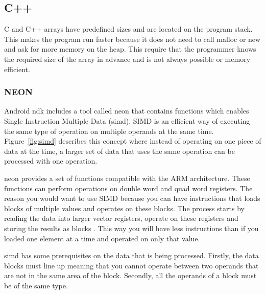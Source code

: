 \subsection{C++}
C and C++ arrays have predefined sizes and are located on the program stack. This makes the program run faster because it does not need to call malloc or new and ask for more memory on the heap. This require that the programmer knows the required size of the array in advance and is not always possible or memory efficient.

\subsubsection{NEON}
Android \gls{ndk} includes a tool called \gls{neon} that contains functions which enables Single Instruction Multiple Data (\gls{simd}). SIMD is an efficient way of executing the same type of operation on multiple operands at the same time. Figure~\ref{fig:simd} describes this concept where instead of operating on one piece of data at the time, a larger set of data that uses the same operation can be processed with one operation.

\gls{neon} provides a set of functions compatible with the ARM architecture. These functions can perform operations on double word and quad word registers. The reason you would want to use SIMD because you can have instructions that loads blocks of multiple values and operates on these blocks.  The process starts by reading the data into larger vector registers, operate on these registers and storing the results as blocks \cite{simd:expl}. This way you will have less instructions than if you loaded one element at a time and operated on only that value.

\gls{simd} has some prerequisites on the data that is being processed. Firstly, the data blocks must line up meaning that you cannot operate between two operands that are not in the same area of the block. Secondly, all the operands of a block must be of the same type.

